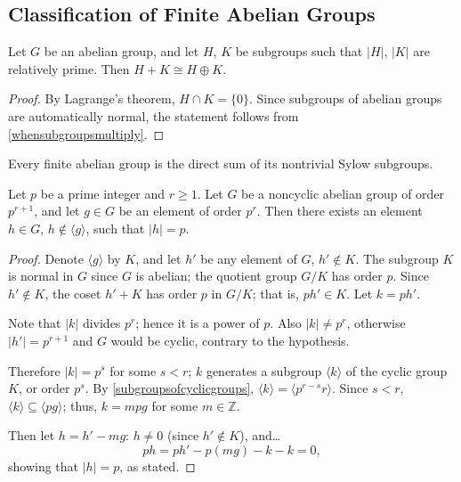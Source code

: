 \subsection{Classification of Finite Abelian Groups}\label{classificationoffiniteabeliangroups}

\begin{lemma}
Let $G$ be an abelian group, and let $H$, $K$ be subgroups such that $|H|$, $|K|$ are relatively prime. Then $H + K \cong H \oplus K$. 
\end{lemma}

\begin{proof}
By Lagrange's theorem, $H \cap K = \{ 0 \}$. Since subgroups of abelian groups are automatically normal, the statement follows from \ref{whensubgroupsmultiply}.
\end{proof}

\begin{corollary}
\label{abeliansylowgroups}
Every finite abelian group is the direct sum of its nontrivial Sylow subgroups.
\end{corollary}

\begin{lemma}
\label{elementoforderpinabeliangroup}
Let $p$ be a prime integer and $r \geq 1$. Let $G$ be a noncyclic abelian group of order $p^{r+1}$, and let $g \in G$ be an element of order $p^r$. Then there exists an element $h \in G$,
$h \not \in \langle g \rangle$, such that $|h| = p$.
\end{lemma}

\begin{proof}
Denote $\langle g \rangle$ by $K$, and let $h'$ be any element of $G$, $h' \not \in K$. The subgroup $K$ is normal in $G$ since $G$ is abelian; the quotient group $G/K$ has order $p$.
Since $h' \not \in K$, the coset $h' + K$ has order $p$ in $G/K$; that is, $ph' \in K$. Let $k = ph'.$

Note that $|k|$ divides $p^r$; hence it is a power of $p$. Also $|k| \neq p^r$, otherwise $|h'| = p^{r+1}$ and $G$ would be cyclic, contrary to the hypothesis.

Therefore $|k| = p^s$ for some $s < r$; $k$ generates a subgroup $\langle k \rangle$ of the cyclic group $K$, or order $p^s$. By \ref{subgroupsofcyclicgroups}, $\langle k \rangle = \langle p^{r-s}r \rangle$.
Since $s < r$, $\langle k \rangle \subseteq \langle pg \rangle$; thus, $k = mpg$ for some $m \in \mathbb{Z}$.

Then let $h = h' - mg$: $h \neq 0$ (since $h' \not \in K$), and\dots
$$ph = ph' - p(mg) - k -k =0,$$
showing that $|h| = p$, as stated.
\end{proof}

